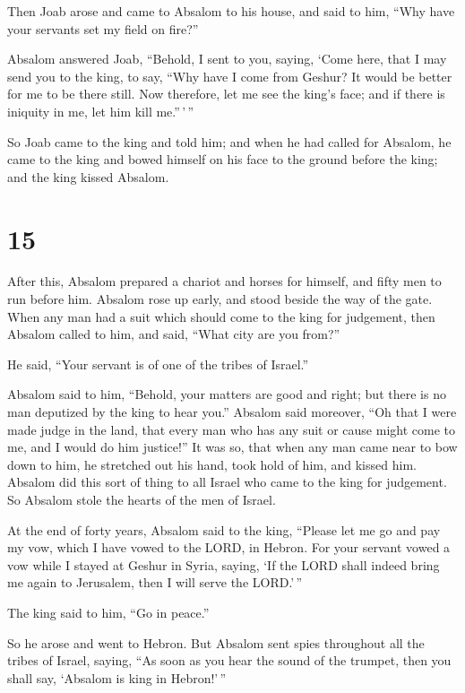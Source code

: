  Then Joab arose and came to Absalom to his house, and said
to him, ``Why have your servants set my field on fire?''

 Absalom answered Joab, ``Behold, I sent to you, saying,
`Come here, that I may send you to the king, to say, ``Why have I come
from Geshur? It would be better for me to be there still. Now therefore,
let me see the king's face; and if there is iniquity in me, let him kill
me.''\,'\,''

 So Joab came to the king and told him; and when he had
called for Absalom, he came to the king and bowed himself on his face to
the ground before the king; and the king kissed Absalom.

\hypertarget{section-14}{%
\section{15}\label{section-14}}

 After this, Absalom prepared a chariot and horses for
himself, and fifty men to run before him.  Absalom rose up
early, and stood beside the way of the gate. When any man had a suit
which should come to the king for judgement, then Absalom called to him,
and said, ``What city are you from?''

He said, ``Your servant is of one of the tribes of Israel.''

 Absalom said to him, ``Behold, your matters are good and
right; but there is no man deputized by the king to hear you.''
 Absalom said moreover, ``Oh that I were made judge in the
land, that every man who has any suit or cause might come to me, and I
would do him justice!''  It was so, that when any man came
near to bow down to him, he stretched out his hand, took hold of him,
and kissed him.  Absalom did this sort of thing to all
Israel who came to the king for judgement. So Absalom stole the hearts
of the men of Israel.

 At the end of forty years, Absalom said to the king,
``Please let me go and pay my vow, which I have vowed to the LORD, in
Hebron.  For your servant vowed a vow while I stayed at
Geshur in Syria, saying, `If the LORD shall indeed bring me again to
Jerusalem, then I will serve the LORD.'\,''

 The king said to him, ``Go in peace.''

So he arose and went to Hebron.  But Absalom sent spies
throughout all the tribes of Israel, saying, ``As soon as you hear the
sound of the trumpet, then you shall say, `Absalom is king in
Hebron!'\,''

